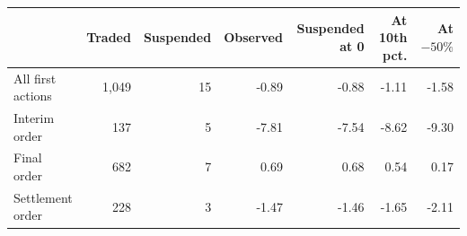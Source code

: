 \begin{tabular*}{\textwidth}[]{l@{\extracolsep\fill}rrrrrr}
\toprule
 & Traded & Suspended & Observed & Suspended at 0 & At 10th pct. & At $-50\%$\\
\midrule
All first actions & 1,049 & 15 & -0.89 & -0.88 & -1.11 & -1.58\\
Interim order & 137 & 5 & -7.81 & -7.54 & -8.62 & -9.30\\
Final order & 682 & 7 & 0.69 & 0.68 & 0.54 & 0.17\\
Settlement order & 228 & 3 & -1.47 & -1.46 & -1.65 & -2.11\\
\bottomrule
\end{tabular*}
